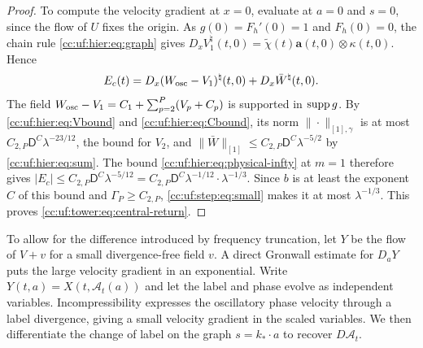 \begin{proof}
To compute the velocity gradient at $x=0$, evaluate at $a=0$ and $s=0$,
since the flow of $U$ fixes the origin. As
\(g(0)=F_h'(0)=1\) and \(F_h(0)=0\), the chain rule
\eqref{cc:uf:hier:eq:graph} gives
\(D_xV_1^\natural(t,0)=\widetilde\chi(t)\mathbf a(t,0)\otimes\kappa(t,0)\).
Hence
\[
 E_c(t)=D_x(W_{\rm osc}-V_1)^\natural(t,0)+D_x\bar W^\natural(t,0).
\]
The field \(W_{\rm osc}-V_1=C_1+\sum_{p=2}^P(V_p+C_p)\) is supported in
\(\operatorname{supp} g\). By \eqref{cc:uf:hier:eq:Vbound} and
\eqref{cc:uf:hier:eq:Cbound}, its norm \(\|\cdot\|_{[1],\gamma}\) is at
most \(C_{2,P}\mathsf D^C\lambda^{-23/12}\), the bound for $V_2$,
and \(\|\bar W\|_{[1]}\le C_{2,P}\mathsf D^C\lambda^{-5/2}\) by
\eqref{cc:uf:hier:eq:sum}. The bound \eqref{cc:uf:hier:eq:physical-infty}
at \(m=1\) therefore gives
\(|E_c|\le C_{2,P}\mathsf D^C\lambda^{-5/12}
=C_{2,P}\mathsf D^C\lambda^{-1/12}\cdot\lambda^{-1/3}\). Since
$b$ is at least the exponent $C$ of this bound and
$\Gamma_P\ge C_{2,P}$, \eqref{cc:uf:step:eq:small} makes it at
most $\lambda^{-1/3}$.
This proves \eqref{cc:uf:tower:eq:central-return}.
\end{proof}

To allow for the difference introduced by frequency truncation, let $Y$
be the flow of $V+v$ for a small divergence-free field $v$. A direct Gronwall
estimate for $D_aY$ puts the large velocity gradient in an exponential.
Write $Y(t,a)=X(t,\mathcal A_t(a))$ and let the label and phase evolve
as independent variables. Incompressibility expresses the oscillatory
phase velocity through a label divergence, giving a small velocity
gradient in the scaled variables. We then differentiate the change of
label on the graph $s=k_*\cdot a$ to recover $D\mathcal A_t$.

